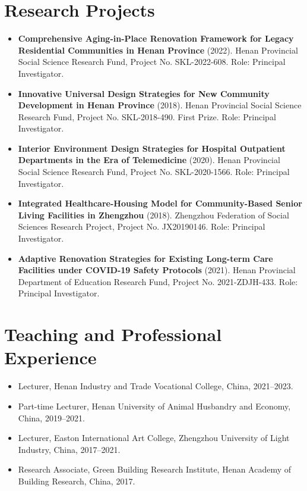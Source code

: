 \documentclass[11pt,a4paper]{article}
\begin{document}
\section*{Research Projects}
\begin{itemize}
  \item \textbf{Comprehensive Aging-in-Place Renovation Framework for Legacy Residential Communities in Henan Province} (2022). Henan Provincial Social Science Research Fund, Project No. SKL-2022-608. Role: Principal Investigator.
  \item \textbf{Innovative Universal Design Strategies for New Community Development in Henan Province} (2018). Henan Provincial Social Science Research Fund, Project No. SKL-2018-490. First Prize. Role: Principal Investigator.
  \item \textbf{Interior Environment Design Strategies for Hospital Outpatient Departments in the Era of Telemedicine} (2020). Henan Provincial Social Science Research Fund, Project No. SKL-2020-1566. Role: Principal Investigator.
  \item \textbf{Integrated Healthcare-Housing Model for Community-Based Senior Living Facilities in Zhengzhou} (2018). Zhengzhou Federation of Social Sciences Research Project, Project No. JX20190146. Role: Principal Investigator.
  \item \textbf{Adaptive Renovation Strategies for Existing Long-term Care Facilities under COVID-19 Safety Protocols} (2021). Henan Provincial Department of Education Research Fund, Project No. 2021-ZDJH-433. Role: Principal Investigator.
\end{itemize}

\section*{Teaching and Professional Experience}
\begin{itemize}
  \item Lecturer, Henan Industry and Trade Vocational College, China, 2021--2023.
  \item Part-time Lecturer, Henan University of Animal Husbandry and Economy, China, 2019--2021.
  \item Lecturer, Easton International Art College, Zhengzhou University of Light Industry, China, 2017--2021.
  \item Research Associate, Green Building Research Institute, Henan Academy of Building Research, China, 2017.
\end{itemize}
\end{document}
